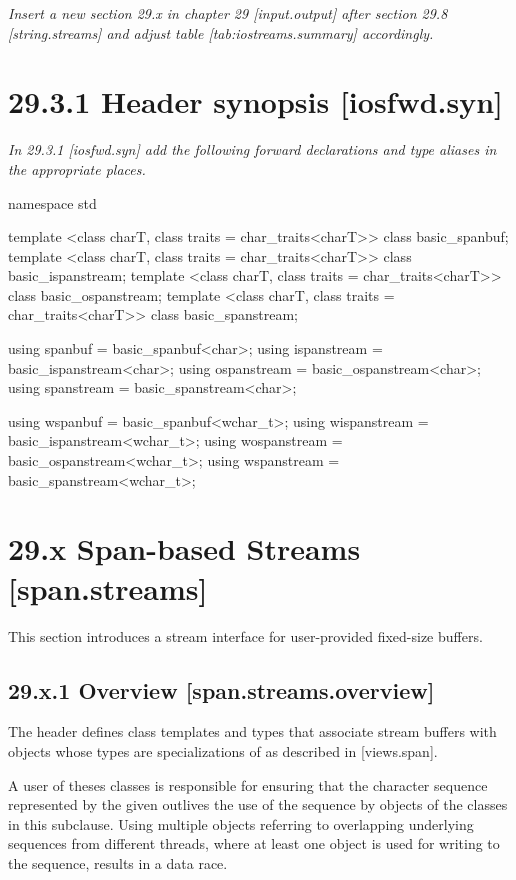 \documentclass[ebook,11pt,article]{memoir}
\begin{document}
\emph{Insert a new section 29.x in chapter 29 [input.output] after section 29.8 [string.streams] and adjust table [tab:iostreams.summary] accordingly.}


\section{29.3.1 Header  synopsis [iosfwd.syn]}

\emph{In 29.3.1 [iosfwd.syn] add the following forward declarations and type aliases in the appropriate places.}

\begin{codeblock}
namespace std {
  template <class charT, class traits = char_traits<charT>>
    class basic_spanbuf;
  template <class charT, class traits = char_traits<charT>>
    class basic_ispanstream;
  template <class charT, class traits = char_traits<charT>>
    class basic_ospanstream;
  template <class charT, class traits = char_traits<charT>>
    class basic_spanstream;

  using spanbuf     = basic_spanbuf<char>;
  using ispanstream = basic_ispanstream<char>;
  using ospanstream = basic_ospanstream<char>;
  using spanstream  = basic_spanstream<char>;

  using wspanbuf     = basic_spanbuf<wchar_t>;
  using wispanstream = basic_ispanstream<wchar_t>;
  using wospanstream = basic_ospanstream<wchar_t>;
  using wspanstream  = basic_spanstream<wchar_t>;
}
\end{codeblock}



\section{29.x Span-based Streams [span.streams]}

\pnum
This section introduces a stream interface for user-provided fixed-size buffers. 
\subsection{29.x.1 Overview [span.streams.overview]}

\pnum
The header  defines class templates and types that associate stream buffers with objects whose types are specializations of  as described in [views.span]. 

\begin{note}
A user of theses classes is responsible for ensuring that the character sequence represented by the given  outlives the use of the sequence by objects of the classes in this subclause. Using multiple  objects referring to overlapping underlying sequences from different threads, where at least one  object is used for writing to the sequence, results in a data race.
\end{note}
\end{document}

